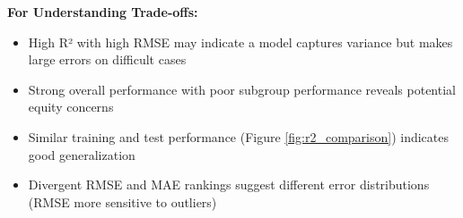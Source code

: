 \textbf{For Understanding Trade-offs:}
\begin{itemize}
    \item High R² with high RMSE may indicate a model captures variance but makes large errors on difficult cases
    \item Strong overall performance with poor subgroup performance reveals potential equity concerns
    \item Similar training and test performance (Figure \ref{fig:r2_comparison}) indicates good generalization
    \item Divergent RMSE and MAE rankings suggest different error distributions (RMSE more sensitive to outliers)
\end{itemize}